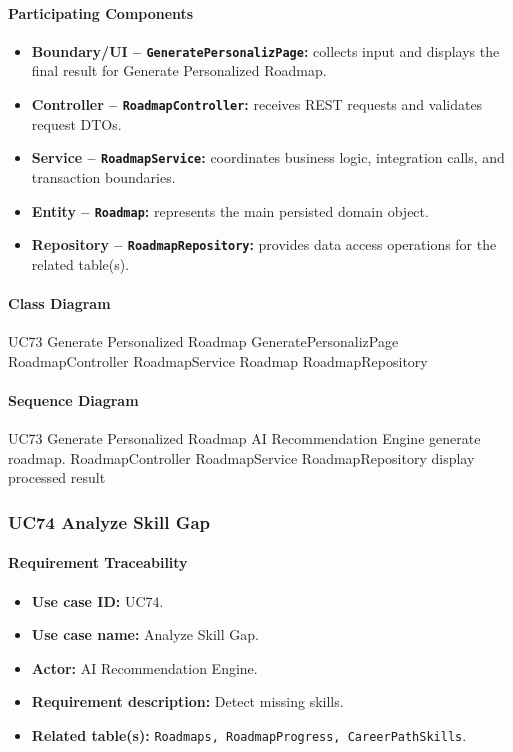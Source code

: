 \paragraph{Participating Components}

\begin{itemize}
    \item \textbf{Boundary/UI -- \texttt{GeneratePersonalizPage}:} collects input and displays the final result for Generate Personalized Roadmap.
    \item \textbf{Controller -- \texttt{RoadmapController}:} receives REST requests and validates request DTOs.
    \item \textbf{Service -- \texttt{RoadmapService}:} coordinates business logic, integration calls, and transaction boundaries.
    \item \textbf{Entity -- \texttt{Roadmap}:} represents the main persisted domain object.
    \item \textbf{Repository -- \texttt{RoadmapRepository}:} provides data access operations for the related table(s).
\end{itemize}

\paragraph{Class Diagram}

\ClassDiagram
{UC73 Generate Personalized Roadmap}
{GeneratePersonalizPage}
{RoadmapController}
{RoadmapService}
{Roadmap}
{RoadmapRepository}

\paragraph{Sequence Diagram}

\SequenceDiagram
{UC73 Generate Personalized Roadmap}
{AI Recommendation Engine}
{generate roadmap.}
{RoadmapController}
{RoadmapService}
{RoadmapRepository}
{display processed result}

\subsubsection{UC74 Analyze Skill Gap}

\paragraph{Requirement Traceability}

\begin{itemize}
    \item \textbf{Use case ID:} UC74.
    \item \textbf{Use case name:} Analyze Skill Gap.
    \item \textbf{Actor:} AI Recommendation Engine.
    \item \textbf{Requirement description:} Detect missing skills.
    \item \textbf{Related table(s):} \texttt{Roadmaps, RoadmapProgress, CareerPathSkills}.
\end{itemize}

